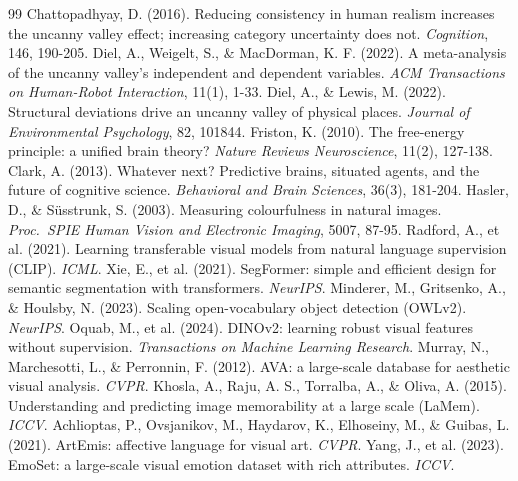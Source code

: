 \documentclass[11pt]{article}
\begin{document}
\begin{thebibliography}{99}
Chattopadhyay, D. (2016). Reducing consistency in human realism increases the uncanny
valley effect; increasing category uncertainty does not. \emph{Cognition}, 146, 190-205.
 Diel, A., Weigelt, S., \& MacDorman, K. F.
(2022). A meta-analysis of the uncanny valley's independent and dependent variables.
\emph{ACM Transactions on Human-Robot Interaction}, 11(1), 1-33.
 Diel, A., \& Lewis, M. (2022). Structural deviations
drive an uncanny valley of physical places. \emph{Journal of Environmental Psychology}, 82, 101844.
 Friston, K. (2010). The free-energy principle: a
unified brain theory? \emph{Nature Reviews Neuroscience}, 11(2), 127-138.
 Clark, A. (2013). Whatever next? Predictive brains,
situated agents, and the future of cognitive science. \emph{Behavioral and Brain
Sciences}, 36(3), 181-204.
 Hasler, D., \& S\"usstrunk, S. (2003).
Measuring colourfulness in natural images. \emph{Proc.\ SPIE Human Vision and Electronic
Imaging}, 5007, 87-95.
 Radford, A., et al. (2021). Learning
transferable visual models from natural language supervision (CLIP). \emph{ICML}.
 Xie, E., et al. (2021). SegFormer: simple and
efficient design for semantic segmentation with transformers. \emph{NeurIPS}.
 Minderer, M., Gritsenko, A., \& Houlsby, N.
(2023). Scaling open-vocabulary object detection (OWLv2). \emph{NeurIPS}.
 Oquab, M., et al. (2024). DINOv2: learning robust
visual features without supervision. \emph{Transactions on Machine Learning Research}.
 Murray, N., Marchesotti, L., \& Perronnin, F.
(2012). AVA: a large-scale database for aesthetic visual analysis. \emph{CVPR}.
 Khosla, A., Raju, A. S., Torralba, A., \& Oliva,
A. (2015). Understanding and predicting image memorability at a large scale (LaMem).
\emph{ICCV}.
 Achlioptas, P., Ovsjanikov, M., Haydarov,
K., Elhoseiny, M., \& Guibas, L. (2021). ArtEmis: affective language for visual art.
\emph{CVPR}.
 Yang, J., et al. (2023). EmoSet: a large-scale visual
emotion dataset with rich attributes. \emph{ICCV}.

\end{thebibliography}
\end{document}
